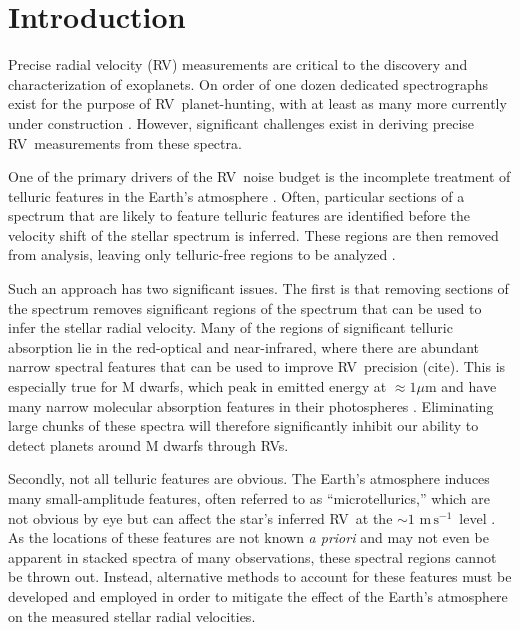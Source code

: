 \documentclass[twocolumn]{aastex62}
\newcommand{\unit}[1]{\mathrm{#1}}
\newcommand{\m}{\unit{m}}
\newcommand{\cm}{\unit{cm}}
\newcommand{\s}{\unit{s}}
\newcommand{\cms}{$\cm\,\s^{-1}$}
\newcommand{\ms}{$\m\,\s^{-1}$}
\newcommand{\acronym}[1]{{\small{#1}}}
\newcommand{\RV}{\acronym{RV}}
\newcommand{\EPRV}{\acronym{EPRV}}
\begin{document}
\section{Introduction}

Precise radial velocity (\RV) measurements are critical to the discovery and characterization of exoplanets. 
On order of one dozen dedicated spectrographs exist for the purpose of \RV\ planet-hunting, with at least as many more currently under construction \citep{Wright2017}. 
However, significant challenges exist in deriving precise \RV\ measurements from these spectra. 

One of the primary drivers of the \RV\ noise budget is the incomplete treatment of telluric features in the
Earth's atmosphere \citep{Halverson2016}. 
Often, particular sections of a spectrum that are likely to feature telluric features are identified before the velocity shift of the stellar spectrum is inferred. 
These regions are then removed from analysis, leaving only telluric-free regions to be analyzed \citep[e.g.][]{AngladaEscude2012}.

Such an approach has two significant issues. 
The first is that removing sections of the spectrum removes significant regions of the spectrum that can be used to infer the stellar radial velocity. 
Many of the regions of significant telluric absorption lie in the red-optical and near-infrared, where there are abundant narrow spectral features that can be used to improve \RV\ precision (cite).
This is especially true for M dwarfs, which peak in emitted energy at $\approx 1 \mu$m and have many narrow molecular absorption features in their photospheres \citep{Figueira2016}.
Eliminating large chunks of these spectra will therefore significantly inhibit our ability to detect planets around M dwarfs through \RV s.

Secondly, not all telluric features are obvious. 
The Earth's atmosphere induces many small-amplitude features, often referred to as ``microtellurics,'' which are not obvious by eye but can affect the star's inferred \RV\ at the $\sim 1$ \ms\ level \citep{Cunha2014}. 
As the locations of these features are not known \textit{a priori} and may not even be apparent in stacked spectra of many observations, these spectral regions cannot be thrown out. 
Instead, alternative methods to account for these features must be developed and employed in order to mitigate the effect of the Earth's atmosphere on the measured stellar radial velocities.
\end{document}
